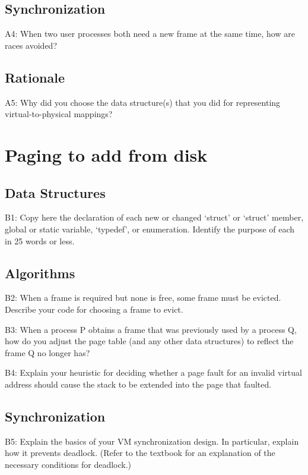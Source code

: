 \documentclass[journal]{IEEEtran}
\begin{document}
\subsection{Synchronization}
A4: When two user processes both need a new frame at the same time, how are races avoided?


\subsection{Rationale}
A5: Why did you choose the data structure(s) that you did for representing virtual-to-physical mappings?
\section{Paging to add from disk}

\subsection{Data Structures}
 B1: Copy here the declaration of each new or changed `struct' or `struct' member, global or static variable, `typedef', or enumeration.  Identify the purpose of each in 25 words or less.

\subsection{Algorithms}
B2: When a frame is required but none is free, some frame must be evicted.  Describe your code for choosing a frame to evict.

B3: When a process P obtains a frame that was previously used by a process Q, how do you adjust the page table (and any other data structures) to reflect the frame Q no longer has?


B4: Explain your heuristic for deciding whether a page fault for an invalid virtual address should cause the stack to be extended into the page that faulted.
\subsection{Synchronization}
B5: Explain the basics of your VM synchronization design.  In particular, explain how it prevents deadlock.  (Refer to the textbook for an explanation of the necessary conditions for deadlock.)
\end{document}
